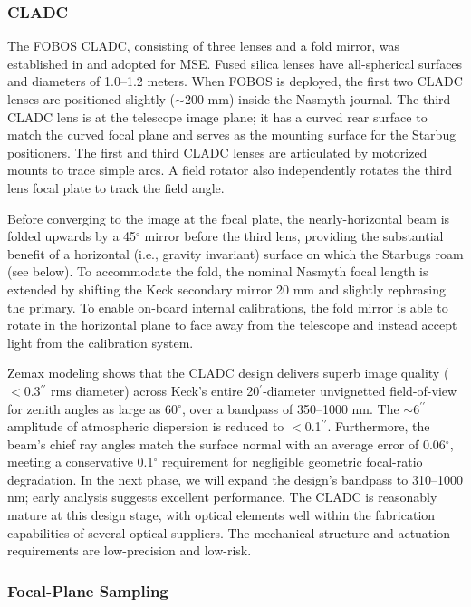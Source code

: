 \documentclass[oneside,11pt]{amsart}
\newcommand{\arcsec}{\mbox{$^{\prime\prime}$}}
\newcommand{\arcmin}{\mbox{$^{\prime}$}}
\begin{document}
\subsubsection{CLADC} The FOBOS CLADC, consisting of three lenses and a fold mirror, was established in \citet{saunders14} and adopted for MSE.  Fused silica lenses have all-spherical surfaces and diameters of 1.0--1.2 meters.  When FOBOS is deployed, the first two CLADC lenses are positioned slightly ($\sim$200 mm) inside the Nasmyth journal.  The third CLADC lens is at the telescope image plane; it has a curved rear surface to match the curved focal plane and serves as the mounting surface for the Starbug positioners.  The first and third CLADC lenses are articulated by motorized mounts to trace simple arcs.  A field rotator also independently rotates the third lens focal plate to track the field angle.

Before converging to the image at the focal plate, the nearly-horizontal beam is folded upwards by a 45$^\circ$ mirror before the third lens, providing the substantial benefit of a horizontal (i.e., gravity invariant) surface on which the Starbugs roam (see below).  To accommodate the fold, the nominal Nasmyth focal length is extended by shifting the Keck secondary mirror 20 mm and slightly rephrasing the primary. To enable on-board internal calibrations, the fold mirror is able to rotate in the horizontal plane to face away from the telescope and instead accept light from the calibration system.

Zemax modeling shows that the CLADC design delivers superb image quality ($<$0.3\arcsec{} rms diameter) across Keck's entire 20\arcmin{}-diameter unvignetted field-of-view for zenith angles as large as 60$^\circ$, over a bandpass of 350--1000 nm.  The $\sim$6\arcsec{} amplitude of atmospheric dispersion is reduced to $<$0.1\arcsec{}.  Furthermore, the beam's chief ray angles match the surface normal with an average error of 0.06$^\circ$, meeting a conservative 0.1$^\circ$ requirement for negligible geometric focal-ratio degradation.  In the next phase, we will expand the design's bandpass to 310--1000 nm; early analysis suggests excellent performance.  The CLADC is reasonably mature at this design stage, with optical elements well within the fabrication capabilities of several optical suppliers.  The mechanical structure and actuation requirements are low-precision and low-risk.

\subsubsection{Focal-Plane Sampling}
\end{document}
